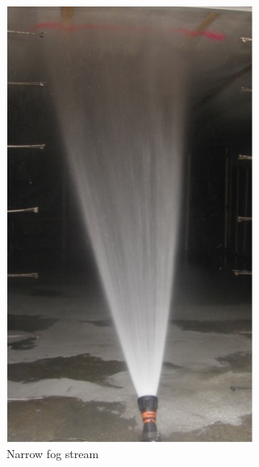 \documentclass[12pt,oneside]{book}
\begin{document}
\begin{figure}[!ht]
	\begin{subfigure}[b]{0.45\columnwidth}
		\centering
		\includegraphics[width=0.75\columnwidth]{../Figures/Pictures/NF_example}
		\caption{Narrow fog stream}
	\end{subfigure}
	\begin{subfigure}[b]{0.45\columnwidth}
		\centering

\end{subfigure}
\end{figure}
\end{document}
